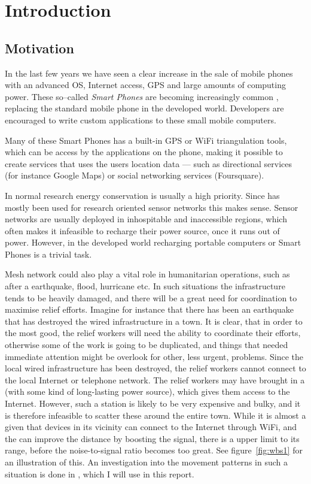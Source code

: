 \section{Introduction}
\label{section:introduction} 

\subsection{Motivation}

In the last few years we have seen a clear increase in the sale of mobile phones with an advanced OS, Internet access, GPS and large amounts of computing power. These so--called \emph{Smart Phones} are becoming increasingly common , replacing the standard mobile phone in the developed world. Developers are encouraged to write custom applications to these small mobile computers.
 
Many of these Smart Phones has a built-in GPS or WiFi triangulation tools, which can be access by the applications on the phone, making it possible to create services that uses the users location data --- such as directional services (for instance Google Maps) or social networking services (Foursquare).

In normal \anet research energy conservation is usually a high priority. Since \anet has mostly been used for research oriented sensor networks this makes sense. Sensor networks are usually deployed in inhospitable and inaccessible regions, which often makes it infeasible to recharge their power source, once it runs out of power. However, in the developed world recharging portable computers or Smart Phones is a trivial task. 

Mesh network could also play a vital role in humanitarian operations, such as after a earthquake, flood, hurricane etc. In such situations the infrastructure tends to be heavily damaged, and there will be a great need for coordination to maximise relief efforts. Imagine for instance that there has been an earthquake that has destroyed the wired infrastructure in a town. It is clear, that in order to the most good, the relief workers will need the ability to coordinate their efforts, otherwise some of the work is going to be duplicated, and things that needed immediate attention might be overlook for other, less urgent, problems. Since the local wired infrastructure has been destroyed, the relief workers cannot connect to the local Internet or telephone network. The relief workers may have brought in a \wbs (with some kind of long-lasting power source), which gives them access to the Internet. However, such a station is likely to be very expensive and bulky, and it is therefore infeasible to scatter these around the entire town. While it is almost a given that devices in its vicinity can connect to the Internet through WiFi, and the \wbs can improve the distance by boosting the signal, there is a upper limit to its range, before the noise-to-signal ratio becomes too great. See figure~\ref{fig:wbs1} for an illustration of this. An investigation into the movement patterns in such a situation is done in \cite{disasterArea}, which I will use in this report.

